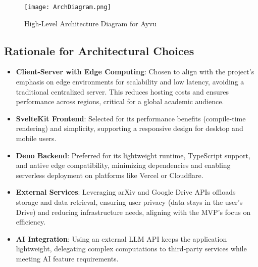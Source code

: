 \documentclass[12pt]{article}
\begin{document}
\begin{figure}
  \centering
  \texttt{[image: ArchDiagram.png]}
  \caption{High-Level Architecture Diagram for Ayvu}
  \label{fig:architectureDiagram}
\end{figure}

\subsection{Rationale for Architectural Choices}
\begin{itemize}
  \item \textbf{Client-Server with Edge Computing}: Chosen to align with the project's emphasis on edge environments for scalability and low latency, avoiding a traditional centralized server. This reduces hosting costs and ensures performance across regions, critical for a global academic audience.
  \item \textbf{SvelteKit Frontend}: Selected for its performance benefits (compile-time rendering) and simplicity, supporting a responsive design for desktop and mobile users.
  \item \textbf{Deno Backend}: Preferred for its lightweight runtime, TypeScript support, and native edge compatibility, minimizing dependencies and enabling serverless deployment on platforms like Vercel or Cloudflare.
  \item \textbf{External Services}: Leveraging arXiv and Google Drive APIs offloads storage and data retrieval, ensuring user privacy (data stays in the user's Drive) and reducing infrastructure needs, aligning with the MVP's focus on efficiency.
  \item \textbf{AI Integration}: Using an external LLM API keeps the application lightweight, delegating complex computations to third-party services while meeting AI feature requirements.
\end{itemize}
\end{document}

